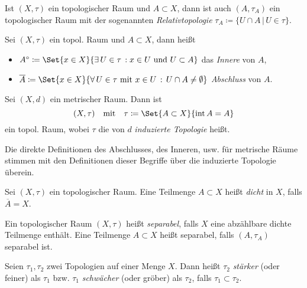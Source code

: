 \documentclass{cheat-sheet}
\newcommand{\inte}{\mathop{\mathrm{int}}} %
\begin{document}
\begin{definition}
  Ist $(X, \tau)$ ein topologischer Raum und $A \subset X$, dann ist auch $(A, \tau_A)$ ein topologischer Raum mit der sogenannten \emph{Relativtopologie} $\tau_A \coloneqq \{ U \cap A \,|\,U \in \tau \}$.
\end{definition}

\begin{definition}
  Sei $(X, \tau)$ ein topol. Raum und $A \subset X$, dann heißt
  \begin{itemize}
    \item $A^\circ \coloneqq \Set{x \in X}{ \ex{U \in \tau} \! x \in U \text{ und } U \subset A }$ das \emph{Innere} von $A$,
    \item $\overline{A} \coloneqq \Set{x \in X}{ \fa{U \in \tau \text{ mit } x \in U} U \cap A \not= \emptyset }$ \emph{Abschluss} von $A$.
  \end{itemize}
\end{definition}

\begin{definition}
  Sei $(X, d)$ ein metrischer Raum. Dann ist
  \[ (X, \tau) \quad \text{mit} \quad \tau \coloneqq \Set{A \subset X}{ \inte A = A } \]
  ein topol. Raum, wobei $\tau$ die von $d$ \emph{induzierte Topologie} heißt.
\end{definition}

\begin{bem}
  Die direkte Definitionen des Abschlusses, des Inneren, usw. für metrische Räume stimmen mit den Definitionen dieser Begriffe über die induzierte Topologie überein.
\end{bem}

\begin{definition}
  Sei $(X, \tau)$ ein topologischer Raum. Eine Teilmenge $A \subset X$ heißt \emph{dicht} in $X$, falls $\overline{A} = X$.
\end{definition}

\begin{definition}
  Ein topologischer Raum $(X, \tau)$ heißt \emph{separabel}, falls $X$ eine abzählbare dichte Teilmenge enthält. Eine Teilmenge $A \subset X$ heißt separabel, falls $(A, \tau_A)$ separabel ist.
\end{definition}

\begin{definition}
  Seien $\tau_1, \tau_2$ zwei Topologien auf einer Menge $X$. Dann heißt $\tau_2$ \emph{stärker} (oder feiner) als $\tau_1$ bzw. $\tau_1$ \emph{schwächer} (oder gröber) als $\tau_2$, falls $\tau_1 \subset \tau_2$.
\end{definition}
\end{document}
